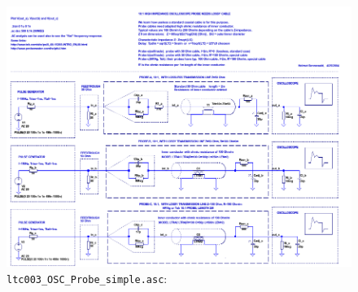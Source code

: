     \begin{figure}[ht!]
      \centering
      \includegraphics[width=1\linewidth]{../ltspice/ltc002_OSC_Probe.pdf}
      \caption{\texttt{ltc003\_OSC\_Probe\_simple.asc}: }
      \label{SPICE:fig_ltc002_OSC}
    \end{figure}

    

